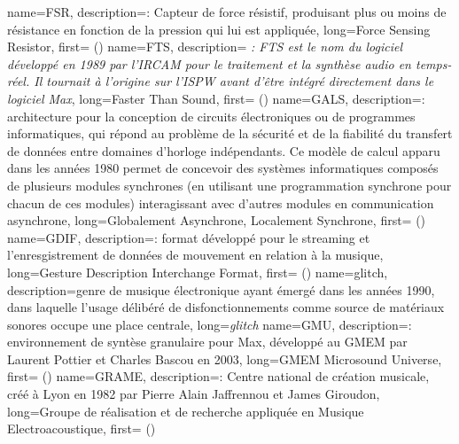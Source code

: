 {
    name={FSR},
    description={\textit{}: Capteur de force résistif, produisant plus ou moins de résistance en fonction de la pression qui lui est appliquée},
    long={Force Sensing Resistor},
    first={ ()}
}
{
    name={FTS},
    description={\textit{ : FTS est le nom du logiciel développé en 1989 par l'IRCAM pour le traitement et la synthèse audio en temps-réel. Il tournait à l'origine sur l'\gls{ISPW} avant d'être intégré directement dans le logiciel Max}},
    long={Faster Than Sound},
    first={ ()}
}
{
    name={GALS},
    description={\textit{}: architecture pour la conception de circuits électroniques ou de programmes informatiques, qui répond au problème de la sécurité et de la fiabilité du transfert de données entre domaines d'horloge indépendants. Ce modèle de calcul apparu dans les années 1980 permet de concevoir des systèmes informatiques composés de plusieurs modules synchrones (en utilisant une programmation synchrone pour chacun de ces modules) interagissant avec d'autres modules en communication asynchrone},
    long={Globalement Asynchrone, Localement Synchrone},
    first={ ()}
}
{
    name={GDIF},
    description={\textit{}: format développé pour le streaming et l'enresgistrement de données de mouvement en relation à la musique},
    long={Gesture Description Interchange Format},
    first={ ()}
}
{
    name={glitch},
    description={genre de musique électronique ayant émergé dans les années 1990, dans laquelle l'usage délibéré de disfonctionnements comme source de matériaux sonores occupe une place centrale},
    long={\textit{glitch}}
}
{
    name={GMU},
    description={\textit{}: environnement de syntèse granulaire pour Max, développé au \gls{GMEM} par Laurent Pottier et Charles Bascou en 2003},
    long={GMEM Microsound Universe},
    first={ ()}
}
{
    name={GRAME},
    description={\textit{}: Centre national de création musicale, créé à Lyon en 1982 par Pierre Alain Jaffrennou et James Giroudon},
    long={Groupe de réalisation et de recherche appliquée en Musique Electroacoustique},
    first={ ()}
}

